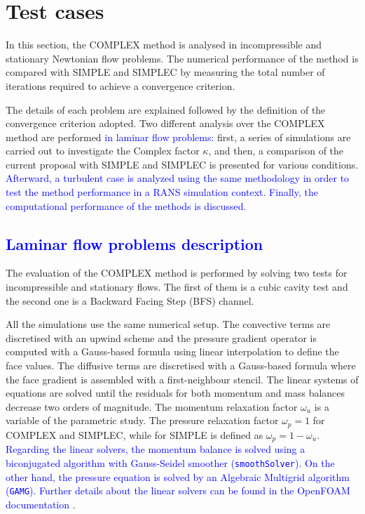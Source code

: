 \documentclass[final,3p,times,11pt,onecolumn]{myElsarticle}
\numberwithin{equation}{section}
\begin{document}
\section{Test cases}
\label{sec:cases}

In this section, the COMPLEX method is analysed in incompressible and stationary Newtonian flow problems. The numerical performance of the method is compared with SIMPLE and SIMPLEC by measuring the total number of iterations required to achieve a convergence criterion.

The details of each problem are explained followed by the definition of the convergence criterion adopted. Two different analysis over the COMPLEX method are performed \textcolor{blue}{in laminar flow problems:} first, a series of simulations are carried out to investigate the Complex factor $\kappa$, and then, a comparison of the current proposal with SIMPLE and SIMPLEC is presented for various conditions. 
\textcolor{blue}{Afterward, a turbulent case is analyzed using the same methodology in order to test the method performance in a RANS simulation context. Finally, the computational performance of the methods is discussed.}

\subsection{\textcolor{blue}{Laminar flow problems description}}\label{Section:problemDescription}

 The evaluation of the COMPLEX method is performed by solving two tests for incompressible and stationary flows. The first of them is a cubic cavity test and the second one is a Backward Facing Step (BFS) channel.

All the simulations use the same numerical setup. The convective terms are discretised with an upwind scheme and the pressure gradient operator is computed with a Gauss-based formula using linear interpolation to define the face values. The diffusive terms are discretised with a Gauss-based formula where the face gradient is assembled with a first-neighbour stencil. The linear systems of equations are solved until the residuals for both momentum and mass balances decrease two orders of magnitude. The momentum relaxation factor $\omega_u$ is a variable of the parametric study. The pressure relaxation factor $\omega_p = 1$ for COMPLEX and SIMPLEC, while for SIMPLE is defined as $\omega_p = 1 - \omega_u$.    
 \textcolor{blue}{ 
Regarding the linear solvers, the momentum balance is solved using a biconjugated algorithm with Gauss-Seidel smoother (\texttt{smoothSolver}). On the other hand, the pressure equation is solved by an Algebraic Multigrid algorithm (\texttt{GAMG}). Further details about the linear solvers can be found in the OpenFOAM documentation \cite{greenshields2015openfoam}}.
\end{document}

